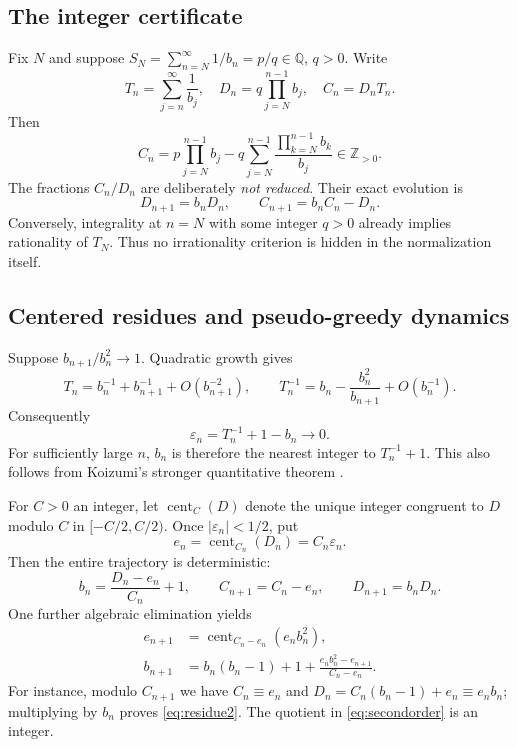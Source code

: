 \documentclass[11pt,a4paper]{article}
\theoremstyle{remark}\newtheorem{remark}[theorem]{Remark}
\newcommand{\Z}{\mathbb Z}\newcommand{\Q}{\mathbb Q}\newcommand{\R}{\mathbb R}\newcommand{\C}{\mathbb C}
\DeclareMathOperator{\cent}{cent}\DeclareMathOperator{\Log}{Log}
\begin{document}
\subsection{The integer certificate}
Fix $N$ and suppose $S_N=\sum_{n=N}^\infty1/b_n=p/q\in\Q$, $q>0$.
Write
\begin{equation}\label{eq:tails}
 T_n=\sum_{j=n}^\infty\frac1{b_j},\quad
 D_n=q\prod_{j=N}^{n-1}b_j,\quad C_n=D_nT_n.
\end{equation}
Then
\[
 C_n=p\prod_{j=N}^{n-1}b_j-
 q\sum_{j=N}^{n-1}\frac{\prod_{k=N}^{n-1}b_k}{b_j}
 \in\Z_{>0}.
\]
The fractions $C_n/D_n$ are deliberately \emph{not reduced}.
Their exact evolution is
\begin{equation}\label{eq:exactupdate}
 D_{n+1}=b_nD_n,\qquad C_{n+1}=b_nC_n-D_n.
\end{equation}
Conversely, integrality at $n=N$ with some integer $q>0$ already implies
rationality of $T_N$. Thus no irrationality criterion is hidden in the
normalization itself.

\subsection{Centered residues and pseudo-greedy dynamics}
Suppose $b_{n+1}/b_n^2\to1$. Quadratic growth gives
\[
 T_n=b_n^{-1}+b_{n+1}^{-1}+O(b_{n+1}^{-2}),\qquad
 T_n^{-1}=b_n-\frac{b_n^2}{b_{n+1}}+O(b_n^{-1}).
\]
Consequently
\begin{equation}\label{eq:gap}
 \varepsilon_n=T_n^{-1}+1-b_n\longrightarrow0.
\end{equation}
For sufficiently large $n$, $b_n$ is therefore the nearest integer to
$T_n^{-1}+1$. This also follows from Koizumi's stronger quantitative theorem
\cite[Theorem~1]{koizumi}.

For $C>0$ an integer, let $\cent_C(D)$ denote the unique integer congruent to
$D$ modulo $C$ in $[-C/2,C/2)$. Once $|\varepsilon_n|<1/2$, put
\[
 e_n=\cent_{C_n}(D_n)=C_n\varepsilon_n.
\]
Then the entire trajectory is deterministic:
\begin{equation}\label{eq:modular}
 \boxed{\quad
 b_n=\frac{D_n-e_n}{C_n}+1,\qquad
 C_{n+1}=C_n-e_n,\qquad D_{n+1}=b_nD_n.
 \quad}
\end{equation}
One further algebraic elimination yields
\begin{align}
 e_{n+1}&=\cent_{C_n-e_n}(e_nb_n^2),\label{eq:residue2}\\
 b_{n+1}&=b_n(b_n-1)+1+
       \frac{e_nb_n^2-e_{n+1}}{C_n-e_n}.\label{eq:secondorder}
\end{align}
For instance, modulo $C_{n+1}$ we have $C_n\equiv e_n$ and
$D_n=C_n(b_n-1)+e_n\equiv e_nb_n$; multiplying by $b_n$ proves
\eqref{eq:residue2}. The quotient in \eqref{eq:secondorder} is an integer.
\end{document}

